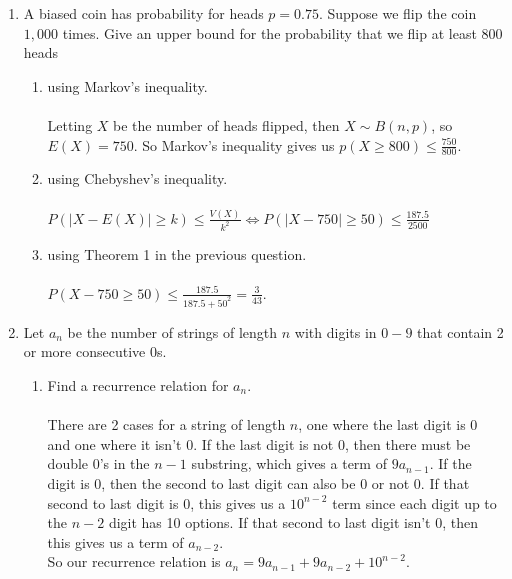 \documentclass[12pt]{article}
\begin{document}
\begin{enumerate}
\begin{enumerate}
\begin{proof}
Now we minimize the function $\frac{\sigma^2+x^2}{(k+x)^2}$ with respect to $x$ to get the best bound. The derivative is $\dfrac{2\left(kx-{\sigma}^2\right)}{\left(x+k\right)^3}$ with a zero at $x=\sigma^2/k$. Plugging in that value to the original gives $\frac{\sigma^2+(\frac{\sigma^2}{k})^2}{(k+(\frac{\sigma^2}{k}))^2} = \frac{\sigma^2k^2+\sigma^4}{(k^2+\sigma^2)^2} = \frac{\sigma^2}{\sigma^2 + k^2}$.\end{proof}


\end{enumerate}
\medskip 
\item A biased coin has probability for heads $p= 0.75$. Suppose we flip the coin $1,000$ times. Give an upper bound for the probability that we flip at least $800$ heads
\begin{enumerate}

\item using Markov's inequality.\\\\
Letting $X$ be the number of heads flipped, then $X\sim B(n,p)$, so  $E(X)=750$. So Markov's inequality gives us $p(X \geq 800) \leq \frac{750}{800}$.
\item using Chebyshev's inequality.\\\\
$P(|X-E(X)| \geq k) \leq \frac{V(X)}{k^2} \Leftrightarrow P(|X-750|\geq 50) \leq \frac{187.5}{2500}$
\item using Theorem 1 in the previous question.\\\\
$P(X-750\geq 50) \leq \frac{187.5}{187.5+50^2} = \frac{3}{43}$.
\end{enumerate}


\medskip

\item Let $a_n$ be the number of strings of length $n$ with digits in $0-9$ that contain 2 or more consecutive 0s.
\begin{enumerate}

\item Find a recurrence relation for $a_n$.\\\\
There are 2 cases for a string of length $n$, one where the last digit is 0 and one where it isn't 0. If the last digit is not 0, then there must be double 0's in the $n-1$ substring, which gives a term of $9a_{n-1}$. If the digit is 0, then the second to last digit can also be 0 or not 0. If that second to last digit is 0, this gives us a $10^{n-2}$ term since each digit up to the $n-2$ digit has 10 options. If that second to last digit isn't 0, then this gives us a term of $a_{n-2}$.\\
So our recurrence relation is $a_n = 9a_{n-1} + 9a_{n-2} + 10^{n-2}$. 


\end{enumerate}
\end{enumerate}
\end{document}
